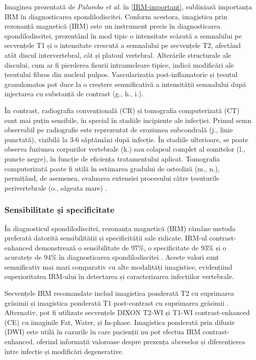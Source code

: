 \documentclass[romanian,12pt,a4paper]{article}
\begin{document}
Imaginea prezentată de \emph{Palumbo et al.} în
\ref{IRM-important}{}, subliniază importanța IRM în
diagnosticarea spondilodiscitei. Conform acestora, imagistica prin
rezonanță magnetică (IRM) este un instrument precis în diagnosticarea
spondilodiscitei, prezentând în mod tipic o intensitate scăzută a
semnalului pe secvențele T1 și o intensitate crescută a semnalului pe
secvențele T2, afectând atât discul intervertebral, cât și platoul
vertebral. Alterările structurale ale discului, cum ar fi pierderea
fisurii intranucleare tipice, indică modificări ale țesutului fibros din
nucleul pulpos. Vascularizația post-inflamatorie și țesutul granulomatos
pot duce la o creștere semnificativă a intensității semnalului după
injectarea cu substanță de contrast (g., h., i.).

În contrast, radiografia convențională (CR) și tomografia computerizată
(CT) sunt mai puțin sensibile, în special în stadiile incipiente ale
infecției. Primul semn observabil pe radiografie este reprezentat de
eroziunea subcondrală (j., linie punctată), vizibilă la 3-6 săptămâni
după infecție. În stadiile ulterioare, se poate observa fuziunea
corpurilor vertebrale (k.) sau colapsul complet al somitelor (l., puncte
negre), în funcție de eficiența tratamentului aplicat. Tomografia
computerizată poate fi utilă în estimarea gradului de osteoliză (m.,
n.), permițând, de asemenea, evaluarea extensiei procesului către
țesuturile perivertebrale (o., săgeata mare)
\cite{DiagnosticInterventionalManagement2020}.

\subsubsection{Sensibilitate și specificitate}

În diagnosticul spondilodiscitei, rezonanța magnetică (IRM) rămâne
metoda preferată datorită sensibilității și specificității sale
ridicate. IRM-ul contrast-enhanced demonstrează o sensibilitate de 97\%,
o specificitate de 93\% și o acuratețe de 94\% în diagnosticarea
spondilodiscitei \cite{ComparisonDiagnosticValue2017}. Aceste valori sunt
semnificativ mai mari comparativ cu alte modalități imagistice,
evidențiind superioritatea IRM-ului în detectarea și caracterizarea
infecțiilor vertebrale.

Secvențele IRM recomandate includ imagistica ponderată T2 cu suprimarea
grăsimii și imagistica ponderată T1 post-contrast cu suprimarea grăsimii
\cite{ComparisonDiagnosticValue2017}. Alternativ, pot fi utilizate
secvențele DIXON T2-WI și T1-WI contrast-enhanced (CE) cu imaginile Fat,
Water, și In-phase. Imagistica ponderată prin difuzie (DWI) este utilă
în cazurile în care pacienții nu pot efectua IRM contrast-enhanced,
oferind informații valoroase despre prezența abceselor și diferențierea
între infecție și modificări degenerative.
\end{document}
